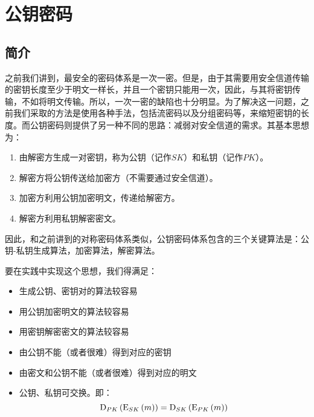 \chapter{公钥密码}
\section{简介}
之前我们讲到，最安全的密码体系是一次一密。但是，由于其需要用安全信道传输的密钥长度至少于明文一样长，并且一个密钥只能用一次，因此，与其将密钥传输，不如将明文传输。所以，一次一密的缺陷也十分明显。为了解决这一问题，之前我们采取的方法是使用各种手法，包括流密码以及分组密码等，来缩短密钥的长度。而公钥密码则提供了另一种不同的思路：减弱对安全信道的需求。其基本思想为：
\begin{enumerate}
	\item 由解密方生成一对密钥，称为公钥（记作$SK$）和私钥（记作$PK$）。
	\item 解密方将公钥传送给加密方（不需要通过安全信道）。
	\item 加密方利用公钥加密明文，传递给解密方。
	\item 解密方利用私钥解密密文。
\end{enumerate}

因此，和之前讲到的对称密码体系类似，公钥密码体系包含的三个关键算法是：公钥-私钥生成算法，加密算法，解密算法。\par
要在实践中实现这个思想，我们得满足：
\begin{itemize}
	\item 生成公钥、密钥对的算法较容易
	\item 用公钥加密明文的算法较容易
	\item 用密钥解密密文的算法较容易
	\item 由公钥不能（或者很难）得到对应的密钥
	\item 由密文和公钥不能（或者很难）得到对应的明文
	\item 公钥、私钥可交换。即：
	\begin{equation}
	{\mathrm{D}_{PK}\left({{\mathrm{E}_{SK}\left({m}\right)}}\right)} = {\mathrm{D}_{SK}\left({{\mathrm{E}_{PK}\left({m}\right)}}\right)}
	\end{equation}
\end{itemize}

